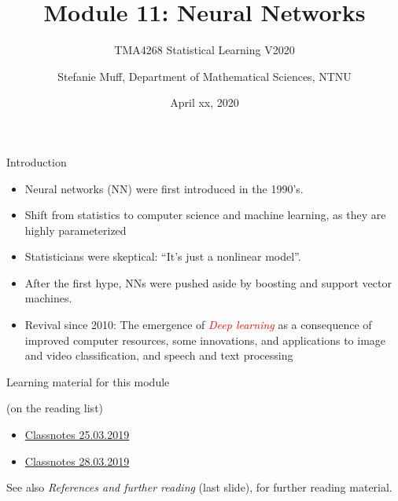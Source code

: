 \documentclass[10pt,ignorenonframetext,]{beamer}
\title{Module 11: Neural Networks}
\subtitle{TMA4268 Statistical Learning V2020}
\author{Stefanie Muff, Department of Mathematical Sciences, NTNU}
\date{April xx, 2020}
\providecommand{\tightlist}{%
  \setlength{\itemsep}{0pt}\setlength{\parskip}{0pt}}
\begin{document}
\frame{\titlepage}

\begin{frame}{Introduction}

\begin{itemize}
\item
  Neural networks (NN) were first introduced in the 1990's.
\item
  Shift from statistics to computer science and machine learning, as
  they are highly parameterized
\item
  Statisticians were skeptical: ``It's just a nonlinear model''.
\item
  After the first hype, NNs were pushed aside by boosting and support
  vector machines.
\item
  Revival since 2010: The emergence of
  \emph{\textcolor{red}{Deep learning}} as a consequence of improved
  computer resources, some innovations, and applications to image and
  video classification, and speech and text processing
\end{itemize}

\end{frame}

\begin{frame}

\begin{block}{Learning material for this module}

(on the reading list)

\vspace{2mm}

\begin{itemize}
\tightlist
\item
  \href{https://www.math.ntnu.no/emner/TMA4268/2019v/notes/M11L1notes.pdf}{Classnotes
  25.03.2019}
\item
  \href{https://www.math.ntnu.no/emner/TMA4268/2019v/notes/M11L2notes.pdf}{Classnotes
  28.03.2019}
\end{itemize}

See also \emph{References and further reading} (last slide), for further
reading material.

\end{block}

\end{frame}
\end{document}
